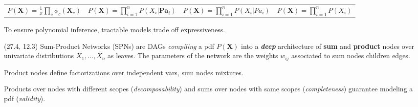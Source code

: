 \documentclass[final]{beamer}
\begin{document}
\begin{frame}{}
\begin{textblock}{25.2}
\begin{table}[!ht]
\begin{tabular}{c c c c}
        \tiny  $P(\mathbf{X})=\frac{1}{Z}\prod\limits_{c}\phi_{c}(\mathbf{X}_{c})$ & 
        \tiny  $P(\mathbf{X})=\prod\limits_{i=1}^nP(X_{i}|\mathbf{Pa}_{i})$&
        \tiny $P(\mathbf{X})=\prod\limits_{i=1}^nP(X_{i}|Pa_{i})$ &
        \tiny $P(\mathbf{X})=\prod\limits_{i=1}^nP(X_{i})$                                                              
      \end{tabular}\bigskip
      
    \end{table}

    To ensure polynomial inference, tractable models trade off
     expressiveness.
  \end{textblock}
  
  \begin{textblock}{25.2}(27.4, 12.3)
    \footnotesize
    Sum-Product Networks (SPNs) are DAGs
    \emph{compiling} a pdf $P(\mathbf{X})$ into a \textbf{\emph{deep}} architecture of \textbf{sum}
    and \textbf{product} nodes over univariate distributions $X_1,\dots,X_n$ as leaves.
    The parameters of the network are the weights $w_{ij}$ associated to sum
    nodes children edges.\par
    
    Product nodes define factorizations over independent vars, sum
    nodes mixtures.\par
    
    
    Products over nodes with different scopes (\emph{decomposability}) and
    sums over nodes with same scopes (\emph{completeness}) guarantee modeling
    a pdf (\emph{validity}).\par\bigskip
    

\end{textblock}
\end{frame}
\end{document}

